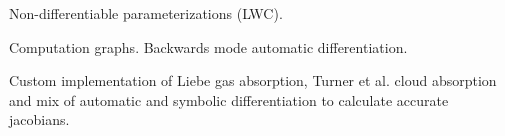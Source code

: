    \stopsubsection

    \startsubsection[title=Symbolic Differentiation]

        Non-differentiable parameterizations (LWC).

    \stopsubsection

    \startsubsection[title=Automatic Differentiation]

        Computation graphs. Backwards mode automatic differentiation.
        
    \stopsubsection

\stopsection


\startsection[title=A Numerical Model]

    \startsubsection[title=Implementation]

    Custom implementation of Liebe gas absorption, Turner et al. cloud
    absorption and mix of automatic and symbolic differentiation to calculate
    accurate jacobians.

    \stopsubsection

    \startsubsection[title={Characterizing Errors},reference=rtm_errors]

    \stopsubsection

\stopsection

